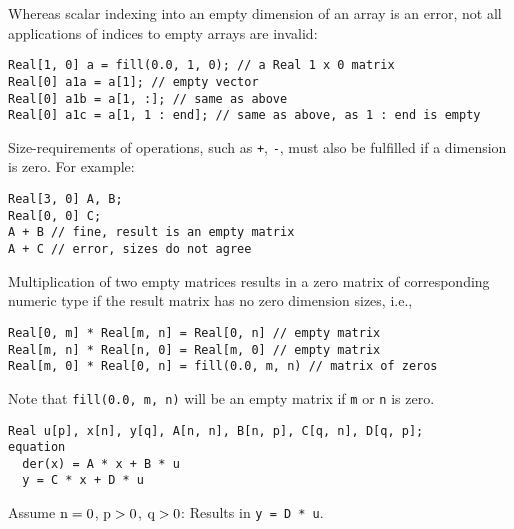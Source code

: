 \begin{example}
Whereas scalar indexing into an empty dimension of an array is an error, not all applications of indices to empty arrays are invalid:
\begin{lstlisting}
Real[1, 0] a = fill(0.0, 1, 0); // a Real 1 x 0 matrix
Real[0] a1a = a[1]; // empty vector
Real[0] a1b = a[1, :]; // same as above
Real[0] a1c = a[1, 1 : end]; // same as above, as 1 : end is empty
\end{lstlisting}
\end{example}

Size-requirements of operations, such as \lstinline!+!, \lstinline!-!, must also be fulfilled if a dimension is zero.  For example:
\begin{lstlisting}[language=modelica]
Real[3, 0] A, B;
Real[0, 0] C;
A + B // fine, result is an empty matrix
A + C // error, sizes do not agree
\end{lstlisting}

Multiplication of two empty matrices results in a zero matrix of corresponding numeric type if the result matrix has no zero dimension sizes, i.e.,
\begin{lstlisting}[language=modelica]
Real[0, m] * Real[m, n] = Real[0, n] // empty matrix
Real[m, n] * Real[n, 0] = Real[m, 0] // empty matrix
Real[m, 0] * Real[0, n] = fill(0.0, m, n) // matrix of zeros
\end{lstlisting}
Note that \lstinline!fill(0.0, m, n)! will be an empty matrix if \lstinline!m! or \lstinline!n! is zero.

\begin{example}
\begin{lstlisting}[language=modelica]
  Real u[p], x[n], y[q], A[n, n], B[n, p], C[q, n], D[q, p];
equation
  der(x) = A * x + B * u
  y = C * x + D * u
\end{lstlisting}
Assume $\text{\lstinline!n!} = 0$, $\text{\lstinline!p!} > 0$, $\text{\lstinline!q!} > 0$: Results in \lstinline!y = D * u!.
\end{example}
